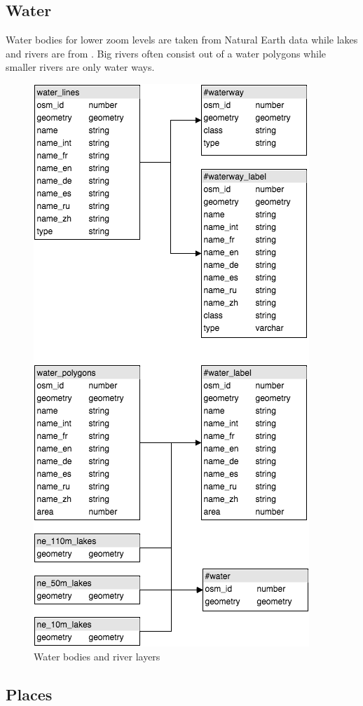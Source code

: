 \newpage
\subsection{Water}
Water bodies for lower zoom levels are taken from Natural Earth
data while lakes and rivers are from \osm{}.
Big rivers often consist out of a water polygons while smaller rivers are only water ways.

\begin{figure}[H]
\centering
  \includegraphics[scale=0.6]{images/water_layer.png}
  \caption{Water bodies and river layers}
\end{figure}

\newpage
\subsection{Places}

